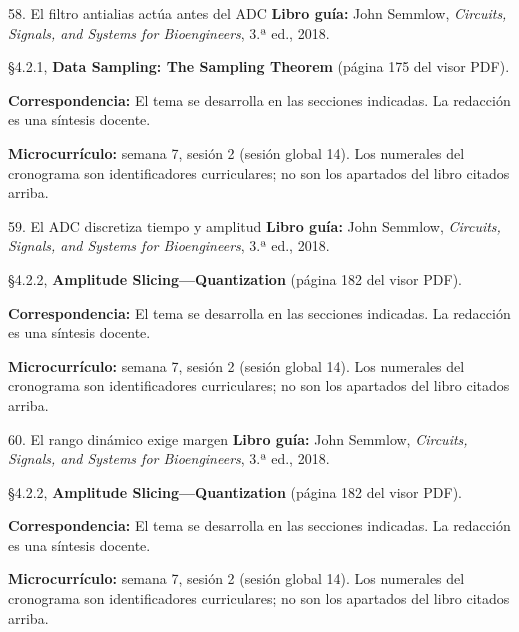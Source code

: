 \documentclass[
  10pt,
  ignorenonframetext,
  aspectratio=169,
  spanish,
]{beamer}
\begin{document}
\begin{frame}{58. El filtro antialias actúa antes del ADC}
\label{el-filtro-antialias-actuxfaa-antes-del-adc}
\textbf{Libro guía:} John Semmlow, \emph{Circuits, Signals, and Systems
for Bioengineers}, 3.ª ed., 2018.

§4.2.1, \textbf{Data Sampling: The Sampling Theorem} (página 175 del
visor PDF).

\textbf{Correspondencia:} El tema se desarrolla en las secciones
indicadas. La redacción es una síntesis docente.

\textbf{Microcurrículo:} semana 7, sesión 2 (sesión global 14). Los
numerales del cronograma son identificadores curriculares; no son los
apartados del libro citados arriba.
\end{frame}

\begin{frame}{59. El ADC discretiza tiempo y amplitud}
\label{el-adc-discretiza-tiempo-y-amplitud}
\textbf{Libro guía:} John Semmlow, \emph{Circuits, Signals, and Systems
for Bioengineers}, 3.ª ed., 2018.

§4.2.2, \textbf{Amplitude Slicing---Quantization} (página 182 del visor
PDF).

\textbf{Correspondencia:} El tema se desarrolla en las secciones
indicadas. La redacción es una síntesis docente.

\textbf{Microcurrículo:} semana 7, sesión 2 (sesión global 14). Los
numerales del cronograma son identificadores curriculares; no son los
apartados del libro citados arriba.
\end{frame}

\begin{frame}{60. El rango dinámico exige margen}
\label{el-rango-dinuxe1mico-exige-margen}
\textbf{Libro guía:} John Semmlow, \emph{Circuits, Signals, and Systems
for Bioengineers}, 3.ª ed., 2018.

§4.2.2, \textbf{Amplitude Slicing---Quantization} (página 182 del visor
PDF).

\textbf{Correspondencia:} El tema se desarrolla en las secciones
indicadas. La redacción es una síntesis docente.

\textbf{Microcurrículo:} semana 7, sesión 2 (sesión global 14). Los
numerales del cronograma son identificadores curriculares; no son los
apartados del libro citados arriba.
\end{frame}
\end{document}

